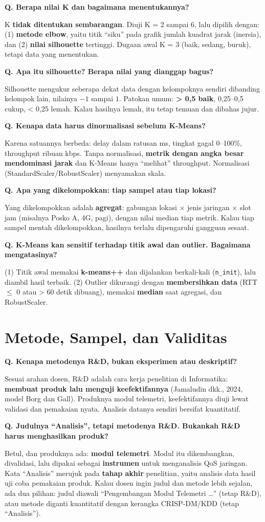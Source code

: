 \documentclass[11pt,a4paper]{article}
\newcounter{q}
\newcommand{\tanya}[2]{\stepcounter{q}%
\par\vspace{6pt}\noindent\colorbox{band}{\parbox{\dimexpr\linewidth-2\fboxsep}{\textbf{Q\arabic{q}. #1}}}\par\vspace{2pt}#2\par}
\begin{document}
\tanya{Berapa nilai K dan bagaimana menentukannya?}{K \textbf{tidak ditentukan sembarangan}. Diuji K = 2 sampai 6, lalu dipilih dengan: (1) \textbf{metode elbow}, yaitu titik ``siku'' pada grafik jumlah kuadrat jarak (inersia), dan (2) \textbf{nilai silhouette} tertinggi. Dugaan awal K = 3 (baik, sedang, buruk), tetapi data yang menentukan.}

\tanya{Apa itu silhouette? Berapa nilai yang dianggap bagus?}{Silhouette mengukur seberapa dekat data dengan kelompoknya sendiri dibanding kelompok lain, nilainya $-1$ sampai $1$. Patokan umum: \textbf{> 0,5 baik}, 0,25--0,5 cukup, < 0,25 lemah. Kalau hasilnya lemah, itu tetap temuan dan dibahas jujur.}

\tanya{Kenapa data harus dinormalisasi sebelum K-Means?}{Karena satuannya berbeda: delay dalam ratusan ms, tingkat gagal 0--100\%, throughput ribuan kbps. Tanpa normalisasi, \textbf{metrik dengan angka besar mendominasi jarak} dan K-Means hanya ``melihat'' throughput. Normalisasi (StandardScaler/RobustScaler) menyamakan skala.}

\tanya{Apa yang dikelompokkan: tiap sampel atau tiap lokasi?}{Yang dikelompokkan adalah \textbf{agregat}: gabungan lokasi $\times$ jenis jaringan $\times$ slot jam (misalnya Posko A, 4G, pagi), dengan nilai median tiap metrik. Kalau tiap sampel mentah dikelompokkan, hasilnya terlalu dipengaruhi gangguan sesaat.}

\tanya{K-Means kan sensitif terhadap titik awal dan outlier. Bagaimana mengatasinya?}{(1) Titik awal memakai \textbf{k-means++} dan dijalankan berkali-kali (\texttt{n\_init}), lalu diambil hasil terbaik. (2) Outlier dikurangi dengan \textbf{membersihkan data} (RTT $\le$ 0 atau > 60 detik dibuang), memakai \textbf{median} saat agregasi, dan RobustScaler.}

\section{Metode, Sampel, dan Validitas}

\tanya{Kenapa metodenya R\&D, bukan eksperimen atau deskriptif?}{Sesuai arahan dosen, R\&D adalah cara kerja penelitian di Informatika: \textbf{membuat produk lalu menguji keefektifannya} (Jamaludin dkk., 2024, model Borg dan Gall). Produknya modul telemetri, keefektifannya diuji lewat validasi dan pemakaian nyata. Analisis datanya sendiri bersifat kuantitatif.}

\tanya{Judulnya ``Analisis'', tetapi metodenya R\&D. Bukankah R\&D harus menghasilkan produk?}{Betul, dan produknya ada: \textbf{modul telemetri}. Modul itu dikembangkan, divalidasi, lalu dipakai sebagai \textbf{instrumen} untuk menganalisis QoS jaringan. Kata ``Analisis'' merujuk pada \textbf{tahap akhir} penelitian, yaitu analisis data hasil uji coba pemakaian produk. Kalau dosen ingin judul dan metode lebih sejalan, ada dua pilihan: judul diawali ``Pengembangan Modul Telemetri \ldots'' (tetap R\&D), atau metode diganti kuantitatif dengan kerangka CRISP-DM/KDD (tetap ``Analisis'').}
\end{document}
